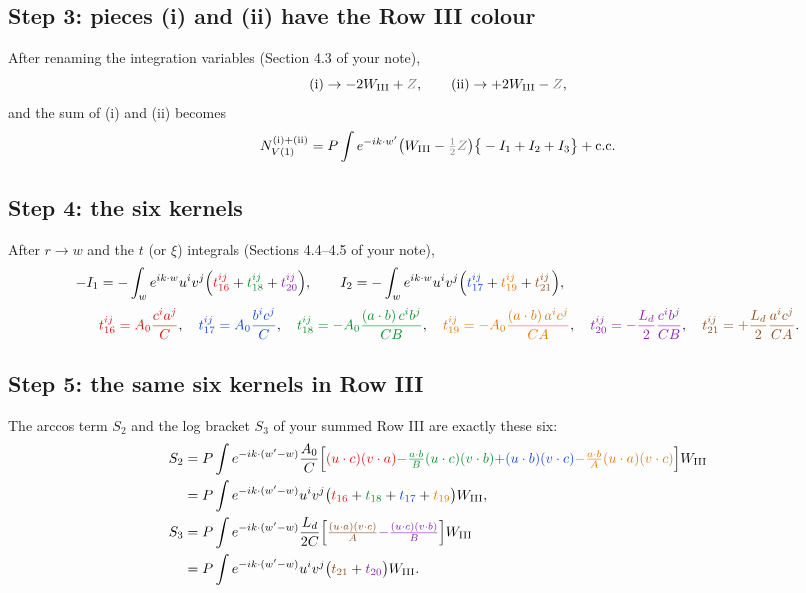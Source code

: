 \documentclass[10pt]{article}
\newcommand{\R}[1]{{\color{cR}#1}}
\newcommand{\B}[1]{{\color{cB}#1}}
\newcommand{\G}[1]{{\color{cG}#1}}
\newcommand{\Or}[1]{{\color{cO}#1}}
\newcommand{\Vi}[1]{{\color{cV}#1}}
\newcommand{\Br}[1]{{\color{cN}#1}}
\newcommand{\Gr}[1]{{\color{cX}#1}}
\begin{document}
\subsection*{Step 3: pieces (i) and (ii) have the Row III colour}
After renaming the integration variables (Section 4.3 of your note),
\begin{equation}
{\rm(i)}\to-2W_{\rm III}+\Gr{Z},\qquad{\rm(ii)}\to+2W_{\rm III}-\Gr{Z},
\end{equation}
and the sum of (i) and (ii) becomes
\begin{equation}
N^{\rm(i)+(ii)}_{V(1)}=P\int e^{-ik\cdot w'}\big(W_{\rm III}-\Gr{\tfrac12Z}\big)\big\{-I_{1}+I_{2}+I_{3}\big\}+{\rm c.c.}
\end{equation}

\subsection*{Step 4: the six kernels}
After $r\to w$ and the $t$ (or $\xi$) integrals (Sections 4.4--4.5 of your note),
\begin{align}
-I_{1}&=-\int_{w}e^{ik\cdot w}u^{i}v^{j}\Big(\R{t_{16}^{ij}}+\G{t_{18}^{ij}}+\Vi{t_{20}^{ij}}\Big),\qquad
I_{2}=-\int_{w}e^{ik\cdot w}u^{i}v^{j}\Big(\B{t_{17}^{ij}}+\Or{t_{19}^{ij}}+\Br{t_{21}^{ij}}\Big),\notag\\[2pt]
&\R{t_{16}^{ij}=A_{0}\frac{c^{i}a^{j}}{C}},\quad
\B{t_{17}^{ij}=A_{0}\frac{b^{i}c^{j}}{C}},\quad
\G{t_{18}^{ij}=-A_{0}\frac{(a\cdot b)\,c^{i}b^{j}}{CB}},\quad
\Or{t_{19}^{ij}=-A_{0}\frac{(a\cdot b)\,a^{i}c^{j}}{CA}},\quad
\Vi{t_{20}^{ij}=-\frac{L_{d}}{2}\frac{c^{i}b^{j}}{CB}},\quad
\Br{t_{21}^{ij}=+\frac{L_{d}}{2}\frac{a^{i}c^{j}}{CA}}.
\end{align}

\subsection*{Step 5: the same six kernels in Row III}
The arccos term $S_{2}$ and the log bracket $S_{3}$ of your summed Row III are exactly these six:
\begin{align}
S_{2}&=P\int e^{-ik\cdot(w'-w)}\frac{A_{0}}{C}\Big[\R{(u\cdot c)(v\cdot a)}\G{-\tfrac{a\cdot b}{B}(u\cdot c)(v\cdot b)}\B{+(u\cdot b)(v\cdot c)}\Or{-\tfrac{a\cdot b}{A}(u\cdot a)(v\cdot c)}\Big]W_{\rm III}\notag\\
&=P\int e^{-ik\cdot(w'-w)}u^{i}v^{j}\big(\R{t_{16}}+\G{t_{18}}+\B{t_{17}}+\Or{t_{19}}\big)W_{\rm III},\notag\\
S_{3}&=P\int e^{-ik\cdot(w'-w)}\frac{L_{d}}{2C}\Big[\Br{\tfrac{(u\cdot a)(v\cdot c)}{A}}\Vi{-\tfrac{(u\cdot c)(v\cdot b)}{B}}\Big]W_{\rm III}\notag\\
&=P\int e^{-ik\cdot(w'-w)}u^{i}v^{j}\big(\Br{t_{21}}+\Vi{t_{20}}\big)W_{\rm III}.
\end{align}
\end{document}
